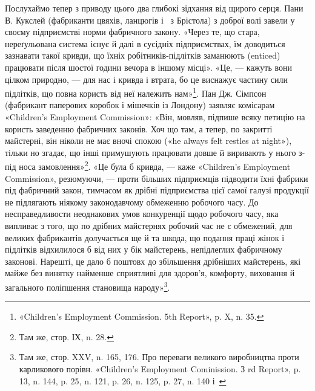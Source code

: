 \parcont{}  %
Послухаймо тепер з приводу цього два глибокі зідхання від щирого серця. Пани
В. Кукслей (фабриканти цвяхів, ланцюгів і~ з Брістола) з доброї волі
завели у своєму підприємстві норми фабричного
закону. «Через те, що стара, нереґульована система існує й далі в сусідніх
підприємствах, їм доводиться зазнавати такої кривди, що їхніх
робітників-підлітків заманюють (enticed) працювати після
шостої години вечора в іншому місці». «Це, — кажуть вони цілком природно, — для
нас і кривда і втрата, бо це виснажує частину сили підлітків, що повна користь
від неї належить нам»\footnote{
«Children's Employment Commission. 5th Report», p. X, n. 35.
}. Пан Дж. Сімпсон (фабрикант паперових коробок і мішечків із Лондону) заявляє
комісарам «Children’s Employment Commission»: «Він, мовляв, підпише всяку
петицію на користь заведенню фабричних законів. Хоч що там,
а тепер, по закритті майстерні, він ніколи не має вночі спокою («he always felt
restles at night»), тільки но згадає, що інші примушують працювати довше й
виривають у нього з-під носа замовлення»\footnote{
Там же, стор. ІХ, n. 28.
}.
«Це була б кривда, — каже «Children’s Employment Commission», резюмуючи, —
проти більших підприємців підводити їхні фабрики під фабричний закон, тимчасом
як дрібні підприємства цієї самої галузі
продукції не підлягають ніякому законодавчому обмеженню робочого часу. До
несправедливости неоднакових умов конкуренції щодо робочого часу, яка випливає
з того, що по дрібних майстернях робочий час не є обмежений, для великих
фабрикантів долучається ще й та шкода, що подання праці
жінок і підлітків відхилилося б від них у бік майстерень, непідлеглих
фабричному законові. Нарешті, це дало б поштовх до збільшення дрібніших
майстерень, які майже без винятку найменше сприятливі для
здоров’я, комфорту, виховання й загального поліпшення становища народу»\footnote{
Там же, стор. XXV, n. 165, 176. Про переваги великого виробництва проти
карликового порівн. «Children’s Employment Cominission. З rd Report», p. 13,
n. 144, p. 25, n. 121, p. 26, n. 125, p. 27, n. 140 і~
}.


